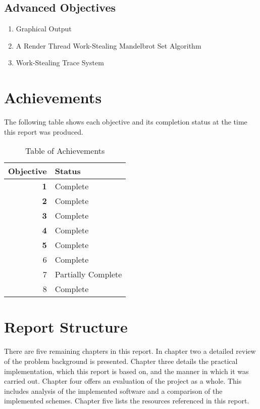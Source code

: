 \subsection*{Advanced Objectives}
\begin{enumerate}
\setcounter{enumi}{\value{saveenum}}
\item Graphical Output
\item A Render Thread Work-Stealing Mandelbrot Set Algorithm
\item Work-Stealing Trace System
\end{enumerate}

\section*{Achievements}
The following table shows each objective and its completion status at the time this
report was produced. 

\begin{table}[H]
    \centering
    \begin{tabular}{|r|l|}
        \hline
            \textbf{Objective} & \textbf{Status} \\
        \hline \hline
            \textbf{1} & Complete \\
            \textbf{2} & Complete \\
            \textbf{3} & Complete \\
            \textbf{4} & Complete \\
            \textbf{5} & Complete \\
        \hline
            6 & Complete \\
            7 & Partially Complete \\
            8 & Complete \\
        \hline
    \end{tabular}
    \caption{Table of Achievements}
    \label{tab:ach}
\end{table}

\section*{Report Structure}

There are five remaining chapters in this report. 
In chapter two a detailed review of the problem background is presented. 
Chapter three details the practical implementation, which this report is based on, and the manner in which it was carried out.
Chapter four offers an evaluation of the project as a whole. This includes analysis of the implemented software and a comparison of the implemented
schemes.
Chapter five lists the resources referenced in this report.

